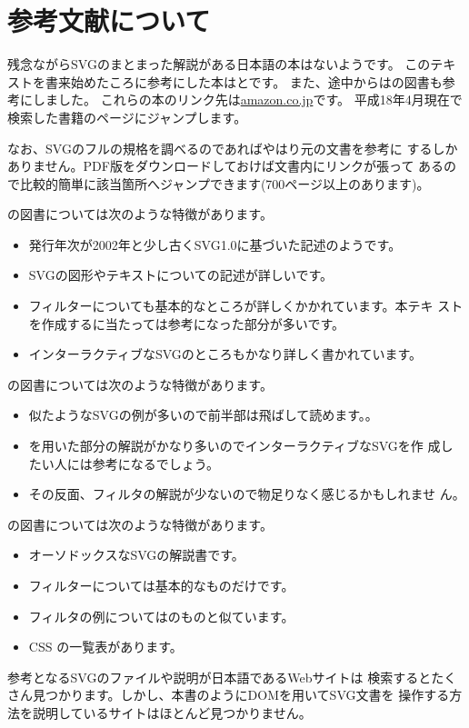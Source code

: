 %
\ifSeminor
\else
\chapter{参考文献について}
残念ながらSVGのまとまった解説がある日本語の本はないようです。
このテキストを書来始めたころに参考にした本は\cite{Cagle}と\cite{Campesato}です。
\ifSeminor
\else
また、途中からは\cite{Eisenberg}の図書も参考にしました。\fi
これらの本のリンク先は\href{http://www.amazon.co.jp}{amazon.co.jp}です。
平成18年4月現在で検索した書籍のページにジャンプします。

なお、SVGのフルの規格を調べるのであればやはり元の文書\cite{SVG11}を参考に
するしかありません。PDF版をダウンロードしておけば文書内にリンクが張って
あるので比較的簡単に該当箇所へジャンプできます(700ページ以上のあります)。

\cite{Cagle}の図書については次のような特徴があります。
\begin{itemize}
 \item 発行年次が2002年と少し古くSVG1.0に基づいた記述のようです。
 \item SVGの図形やテキストについての記述が詳しいです。
\ifSeminor
\else
 \item フィルターについても基本的なところが詳しくかかれています。本テキ
       ストを作成するに当たっては参考になった部分が多いです。
\fi
 \item インターラクティブなSVGのところもかなり詳しく書かれています。
\end{itemize}

\cite{Campesato}の図書については次のような特徴があります。
\begin{itemize}
 \item 似たようなSVGの例が多いので前半部は飛ばして読めます。。
 \item \JS を用いた部分の解説がかなり多いのでインターラクティブなSVGを作
       成したい人には参考になるでしょう。
\ifSeminor
\else
 \item その反面、フィルタの解説が少ないので物足りなく感じるかもしれませ
       ん。
       \fi
\end{itemize}
\ifSeminor
\else
\cite{Eisenberg}の図書については次のような特徴があります。
\begin{itemize}
 \item オーソドックスなSVGの解説書です。
 \item フィルターについては基本的なものだけです。
 \item フィルタの例については\cite{SVG11}のものと似ています。
 \item CSS の一覧表があります。
\end{itemize}
\fi
参考となるSVGのファイルや説明が日本語であるWebサイトは
検索するとたくさん見つかります。しかし、本書のようにDOMを用いてSVG文書を
操作する方法を説明しているサイトはほとんど見つかりません。

